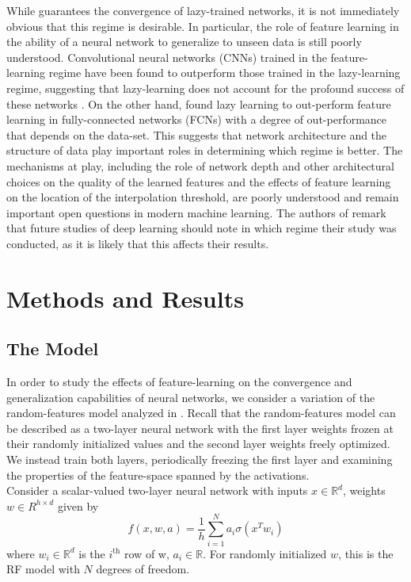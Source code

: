 \documentclass[a4paper, 12pt]{article}
\begin{document}
 While \cite{allen-zhuConvergenceTheoryDeep2019} guarantees the convergence of lazy-trained networks, it is not immediately obvious that this regime is desirable. In particular, the role of feature learning in the ability of a neural network to generalize to unseen data is still poorly understood. Convolutional neural networks (CNNs) trained in the feature-learning regime have been found to outperform those trained in the lazy-learning regime, suggesting that lazy-learning does not account for the profound success of these networks \cite{chizatLazyTrainingDifferentiable2020}. On the other hand, \cite{geigerDisentanglingFeatureLazy2020} found lazy learning to out-perform feature learning in fully-connected networks (FCNs) with a degree of out-performance that depends on the data-set. This suggests that network architecture and the structure of data play important roles in determining which regime is better. The mechanisms at play, including the role of network depth and other architectural choices on the quality of the learned features and the effects of feature learning on the location of the interpolation threshold, are poorly understood and remain important open questions in modern machine learning. The authors of \cite{geigerDisentanglingFeatureLazy2020} remark that future studies of deep learning should note in which regime their study was conducted, as it is likely that this affects their results.

\section{Methods and Results}
\subsection{The Model}

In order to study the effects of feature-learning on the convergence and generalization capabilities of neural networks, we consider a variation of the random-features model analyzed in \cite{meiGeneralizationErrorRandom2019}. Recall that the random-features model can be described as a two-layer neural network with the first layer weights frozen at their randomly initialized values and the second layer weights freely optimized. We instead train both layers, periodically freezing the first layer and examining the properties of the feature-space spanned by the activations. \\

Consider a scalar-valued two-layer neural network with inputs $x \in \mathbb R^d$, weights $w \in R^{h\times d}$ given by 
$$
    f(x, w, a) = \frac{1}{h}\sum_{i=1}^N a_i \sigma(x^Tw_i) 
$$
where $w_i \in \mathbb R^d$ is the $i^\text{th}$ row of w, $a_i \in \mathbb R$. For randomly initialized $w$, this is the RF model with $N$ degrees of freedom.
\end{document}
